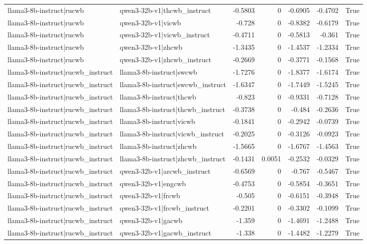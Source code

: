 \begin{table}
\begin{tabular}{l l r r r r l}
llama3-8b-instruct|rucwb & qwen3-32b-v1|thcwb_instruct & -0.5803 & 0 & -0.6905 & -0.4702 & True \\
llama3-8b-instruct|rucwb & qwen3-32b-v1|vicwb & -0.728 & 0 & -0.8382 & -0.6179 & True \\
llama3-8b-instruct|rucwb & qwen3-32b-v1|vicwb_instruct & -0.4711 & 0 & -0.5813 & -0.361 & True \\
llama3-8b-instruct|rucwb & qwen3-32b-v1|zhcwb & -1.3435 & 0 & -1.4537 & -1.2334 & True \\
llama3-8b-instruct|rucwb & qwen3-32b-v1|zhcwb_instruct & -0.2669 & 0 & -0.3771 & -0.1568 & True \\
llama3-8b-instruct|rucwb_instruct & llama3-8b-instruct|swcwb & -1.7276 & 0 & -1.8377 & -1.6174 & True \\
llama3-8b-instruct|rucwb_instruct & llama3-8b-instruct|swcwb_instruct & -1.6347 & 0 & -1.7449 & -1.5245 & True \\
llama3-8b-instruct|rucwb_instruct & llama3-8b-instruct|thcwb & -0.823 & 0 & -0.9331 & -0.7128 & True \\
llama3-8b-instruct|rucwb_instruct & llama3-8b-instruct|thcwb_instruct & -0.3738 & 0 & -0.484 & -0.2636 & True \\
llama3-8b-instruct|rucwb_instruct & llama3-8b-instruct|vicwb & -0.1841 & 0 & -0.2942 & -0.0739 & True \\
llama3-8b-instruct|rucwb_instruct & llama3-8b-instruct|vicwb_instruct & -0.2025 & 0 & -0.3126 & -0.0923 & True \\
llama3-8b-instruct|rucwb_instruct & llama3-8b-instruct|zhcwb & -1.5665 & 0 & -1.6767 & -1.4563 & True \\
llama3-8b-instruct|rucwb_instruct & llama3-8b-instruct|zhcwb_instruct & -0.1431 & 0.0051 & -0.2532 & -0.0329 & True \\
llama3-8b-instruct|rucwb_instruct & qwen3-32b-v1|arcwb_instruct & -0.6569 & 0 & -0.767 & -0.5467 & True \\
llama3-8b-instruct|rucwb_instruct & qwen3-32b-v1|engcwb & -0.4753 & 0 & -0.5854 & -0.3651 & True \\
llama3-8b-instruct|rucwb_instruct & qwen3-32b-v1|frcwb & -0.505 & 0 & -0.6151 & -0.3948 & True \\
llama3-8b-instruct|rucwb_instruct & qwen3-32b-v1|frcwb_instruct & -0.2201 & 0 & -0.3302 & -0.1099 & True \\
llama3-8b-instruct|rucwb_instruct & qwen3-32b-v1|gacwb & -1.359 & 0 & -1.4691 & -1.2488 & True \\
llama3-8b-instruct|rucwb_instruct & qwen3-32b-v1|gacwb_instruct & -1.338 & 0 & -1.4482 & -1.2279 & True \\

\end{tabular}
\end{table}
